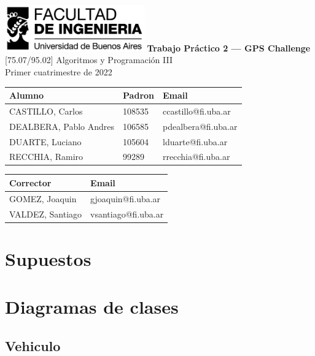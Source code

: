 \documentclass[titlepage,a4paper]{article}
\date{\today}
\title{}
\begin{document}
\begin{titlepage}
    \hfill\includegraphics[width=6cm]{logofiuba.jpg}
    \centering
    \vfill
    \Huge \textbf{Trabajo Práctico 2 — GPS Challenge}
    \vskip2cm
    \Large [75.07/95.02] Algoritmos y Programación III \\
    Primer cuatrimestre de 2022\\
    \vfill
    \begin{tabular}{ | l | l | l | }
      \hline
      Alumno & Padron & Email \\ \hline
      CASTILLO, Carlos & 108535 & ccastillo@fi.uba.ar \\ \hline
      DEALBERA, Pablo Andres & 106585 & pdealbera@fi.uba.ar \\ \hline
      DUARTE, Luciano & 105604 & lduarte@fi.uba.ar \\ \hline
      RECCHIA, Ramiro & 99289 & rrecchia@fi.uba.ar \\ \hline
    \end{tabular}
    \vfill
    \begin{tabular}{ | l | l | }
      \hline
      Corrector & Email \\ \hline
      GOMEZ, Joaquin & gjoaquin@fi.uba.ar \\ \hline
      VALDEZ, Santiago & vsantiago@fi.uba.ar \\ \hline
    \end{tabular}
    \vfill
\end{titlepage}
\tableofcontents
\newpage
{}

\section{Supuestos}
\label{sec:orgb0bda50}

\section{Diagramas de clases}
\label{sec:orgdb29ee6}
\subsection{Vehiculo}
\label{sec:org73857ef}
\end{document}
